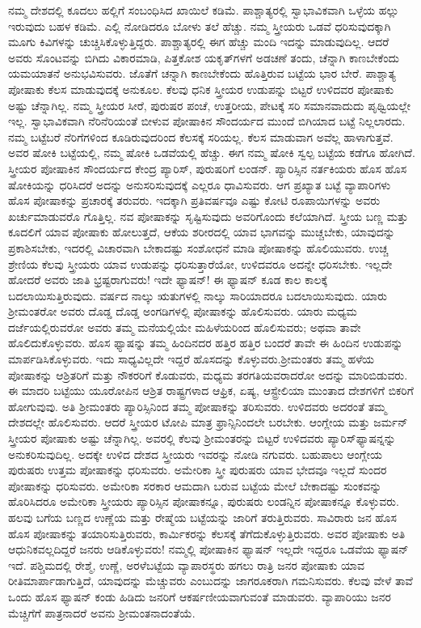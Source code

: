 ನಮ್ಮ ದೇಶದಲ್ಲಿ ಕೂದಲು ಹಲ್ಲಿಗೆ ಸಂಬಂಧಿಸಿದ ಖಾಯಿಲೆ ಕಡಿಮೆ. ಪಾಶ್ಚಾತ್ಯರಲ್ಲಿ ಸ್ವಾಭಾವಿಕವಾಗಿ ಒಳ್ಳೆಯ ಹಲ್ಲು ಇರುವುದು ಬಹಳ ಕಡಿಮೆ. ಎಲ್ಲಿ ನೋಡಿದರೂ ಬೋಳು ತಲೆ ಹೆಚ್ಚು. ನಮ್ಮ ಸ್ತ್ರೀಯರು ಒಡವೆ ಧರಿಸುವುದಕ್ಕಾಗಿ ಮೂಗು ಕಿವಿಗಳನ್ನು ಚುಚ್ಚಿಸಿಕೊಳ್ಳುತ್ತಿದ್ದರು. ಪಾಶ್ಚಾತ್ಯರಲ್ಲಿ ಈಗ ಹೆಚ್ಚು ಮಂದಿ ಇದನ್ನು ಮಾಡುವುದಿಲ್ಲ. ಆದರೆ ಅವರು ಸೊಂಟವನ್ನು ಬಿಗಿದು ವಿಕಾರಮಾಡಿ, ಪಿತ್ತಕೋಶ ಯಕೃತ್​ಗಳಗೆ ಅಡಚಣೆ ತಂದು, ಚೆನ್ನಾಗಿ ಕಾಣಬೇಕೆಂದು ಯಮಯಾತನೆ ಅನುಭವಿಸುವರು. ಜೊತೆಗೆ ಚನ್ನಾಗಿ ಕಾಣಬೇಕೆಂದು ಹೊತ್ತಿರುವ ಬಟ್ಟೆಯ ಭಾರ ಬೇರೆ. ಪಾಶ್ಚಾತ್ಯ ಪೋಷಾಕು ಕೆಲಸ ಮಾಡುವುದಕ್ಕೆ ಅನುಕೂಲ. ಕೆಲವು ಧನಿಕ ಸ್ತ್ರೀಯರ ಉಡುಪನ್ನು ಬಿಟ್ಟರೆ ಉಳಿದವರ ಪೋಷಾಕು ಅಷ್ಟು ಚೆನ್ನಾಗಿಲ್ಲ. ನಮ್ಮ ಸ್ತ್ರೀಯರ ಸೀರೆ, ಪುರುಷರ ಪಂಚೆ, ಉತ್ತರೀಯ, ಪೇಟಕ್ಕೆ ಸರಿ ಸಮಾನವಾದುದು ಪೃಥ್ವಿಯಲ್ಲೇ ಇಲ್ಲ. ಸ್ವಾಭಾವಿಕವಾಗಿ ನೆರಿನೆರಿಯಂತೆ ಬೀಳುವ ಪೋಷಾಕಿನ ಸೌಂದರ್ಯದ ಮುಂದೆ ಬಿಗಿಯಾದ ಬಟ್ಟೆ ನಿಲ್ಲಲಾರದು. ನಮ್ಮ ಬಟ್ಟೆಬರೆ ನೆರಿಗೆಗಳಿಂದ ಕೂಡಿರುವುದರಿಂದ ಕೆಲಸಕ್ಕೆ ಸರಿಯಲ್ಲ. ಕೆಲಸ ಮಾಡುವಾಗ ಅವೆಲ್ಲ ಹಾಳಾಗುತ್ತವೆ. ಅವರ ಷೋಕಿ ಬಟ್ಟೆಯಲ್ಲಿ, ನಮ್ಮ ಷೋಕಿ ಒಡವೆಯಲ್ಲಿ ಹೆಚ್ಚು. ಈಗ ನಮ್ಮ ಷೋಕಿ ಸ್ವಲ್ಪ ಬಟ್ಟೆಯ ಕಡೆಗೂ ಹೋಗಿದೆ. ಸ್ತ್ರೀಯರ ಪೋಷಾಕಿನ ಸೌಂದರ್ಯದ ಕೇಂದ್ರ ಪ್ಯಾರಿಸ್​, ಪುರುಷರಿಗೆ ಲಂಡನ್​. ಪ್ಯಾರಿಸ್ಸಿನ ನರ್ತಕಿಯರು ಹೊಸ ಹೊಸ ಷೋಕಿಯನ್ನು ಧರಿಸಿದರೆ ಅದನ್ನು ಅನುಸರಿಸುವುದಕ್ಕೆ ಎಲ್ಲರೂ ಧಾವಿಸುವರು. ಆಗ ಪ್ರಖ್ಯಾತ ಬಟ್ಟೆ ವ್ಯಾಪಾರಿಗಳು ಹೊಸ ಪೋಷಾಕನ್ನು ಪ್ರಚಾರಕ್ಕೆ ತರುವರು. ಇದಕ್ಕಾಗಿ ಪ್ರತಿವರ್ಷವೂ ಎಷ್ಟು ಕೋಟಿ ರೂಪಾಯಿಗಳನ್ನು ಅವರು ಖರ್ಚುಮಾಡುವರೊ ಗೊತ್ತಿಲ್ಲ. ನವ ಪೋಷಾಕನ್ನು ಸೃಷ್ಟಿಸುವುದು ಅವರಿಗೊಂದು ಕಲೆಯಾಗಿದೆ. ಸ್ತ್ರೀಯ ಬಣ್ಣ ಮತ್ತು ಕೂದಲಿಗೆ ಯಾವ ಪೋಷಾಕು ಹೋಲುತ್ತದೆ, ಆಕೆಯ ಶರೀರದಲ್ಲಿ ಯಾವ ಭಾಗವನ್ನು ಮುಚ್ಚಬೇಕು, ಯಾವುದನ್ನು ಪ್ರಕಾಶಿಸಬೇಕು, ಇದರಲ್ಲಿ ವಿಚಾರವಾಗಿ ಬೇಕಾದಷ್ಟು ಸಂಶೋಧನೆ ಮಾಡಿ ಪೋಷಾಕನ್ನು ಹೊಲಿಯುವರು. ಉಚ್ಚ ಶ್ರೇಣಿಯ ಕೆಲವು ಸ್ತ್ರೀಯರು ಯಾವ ಉಡುಪನ್ನು ಧರಿಸುತ್ತಾರೆಯೋ, ಉಳಿದವರೂ ಅದನ್ನೇ ಧರಿಸಬೇಕು. ಇಲ್ಲದೇ ಹೋದರೆ ಅವರು ಜಾತಿ ಭ್ರಷ್ಟರಾಗುವರು! ಇದೇ ಫ್ಯಾಷನ್​! ಈ ಫ್ಯಾಷನ್​ ಕೂಡ ಕಾಲ ಕಾಲಕ್ಕೆ ಬದಲಾಯಿಸುತ್ತಿರುವುದು. ವರ್ಷದ ನಾಲ್ಕು ಋತುಗಳಲ್ಲಿ ನಾಲ್ಕು ಸಾರಿಯಾದರೂ ಬದಲಾಯಿಸುವುದು. ಯಾರು ಶ‍್ರೀಮಂತರೋ ಅವರು ದೊಡ್ಡ ದೊಡ್ಡ ಅಂಗಡಿಗಳಲ್ಲಿ ಪೋಷಾಕನ್ನು ಹೊಲಿಸುವರು. ಯಾರು ಮಧ್ಯಮ ದರ್ಜೆಯಲ್ಲಿರುವರೋ ಅವರು ತಮ್ಮ ಮನೆಯಲ್ಲಿಯೇ ಮಹಿಳೆಯರಿಂದ ಹೊಲಿಸುವರು; ಅಥವಾ ತಾವೇ ಹೊಲಿದುಕೊಳ್ಳುವರು. ಹೊಸ ಫ್ಯಾಷನ್ನು ತಮ್ಮ ಹಿಂದಿನದರ ಹತ್ತಿರ ಹತ್ತಿರ ಬಂದರೆ ತಾವೇ ಈ ಹಿಂದಿನ ಉಡುಪನ್ನು ಮಾರ್ಪಡಿಸಿಕೊಳ್ಳುವರು. ಇದು ಸಾಧ್ಯವಿಲ್ಲದೇ ಇದ್ದರೆ ಹೊಸದನ್ನು ಕೊಳ್ಳುವರು.\break ಶ‍್ರೀಮಂತರು ತಮ್ಮ ಹಳೆಯ ಪೋಷಾಕನ್ನು ಆಶ್ರಿತರಿಗೆ ಮತ್ತು ನೌಕರರಿಗೆ ಕೊಡುವರು, ಮಧ್ಯಮ ತರಗತಿಯವರಾದರೋ ಅದನ್ನು ಮಾರಿಬಿಡುವರು. ಈ ಮಾದರಿ ಬಟ್ಟೆಯು ಯೂರೋಪಿನ ಆಶ್ರಿತ ರಾಷ್ಟ್ರಗಳಾದ ಆಫ್ರಿಕ, ಏಷ್ಯ, ಆಸ್ಟ್ರೇಲಿಯಾ ಮುಂತಾದ ದೇಶಗಳಿಗೆ ಬಿಕರಿಗೆ ಹೋಗುವುವು. ಅತಿ ಶ‍್ರೀಮಂತರು ಪ್ಯಾರಿಸ್ಸಿನಿಂದ ತಮ್ಮ ಪೋಷಾಕನ್ನು ತರಿಸುವರು. ಉಳಿದವರು ಅದರಂತೆ ತಮ್ಮ ದೇಶದಲ್ಲೇ ಹೊಲಿಸುವರು. ಆದರೆ ಸ್ತ್ರೀಯರ ಟೋಪಿ ಮಾತ್ರ ಫ್ರಾನ್ಸಿನಿಂದಲೇ ಬರಬೇಕು. ಆಂಗ್ಲೇಯ ಮತ್ತು ಜರ್ಮನ್​ ಸ್ತ್ರೀಯರ ಪೋಷಾಕು ಅಷ್ಟು ಚೆನ್ನಾಗಿಲ್ಲ. ಅವರಲ್ಲಿ ಕೆಲವು ಶ‍್ರೀಮಂತರನ್ನು ಬಿಟ್ಟರೆ ಉಳಿದವರು ಪ್ಯಾರಿಸ್​ ಫ್ಯಾಷನ್ನನ್ನು ಅನುಕರಿಸುವುದಿಲ್ಲ. ಅದಕ್ಕೇ ಉಳಿದ ದೇಶದ ಸ್ತ್ರೀಯರು ಇವರನ್ನು ನೋಡಿ ನಗುವರು. ಬಹುಪಾಲು ಆಂಗ್ಲೇಯ ಪುರುಷರು ಉತ್ತಮ ಪೋಷಾಕನ್ನು ಧರಿಸುವರು. ಅಮೇರಿಕಾ ಸ್ತ್ರೀ ಪುರುಷರು ಯಾವ ಭೇದವೂ ಇಲ್ಲದೆ ಸುಂದರ ಪೋಷಾಕನ್ನು ಧರಿಸುವರು. ಅಮೇರಿಕಾ ಸರಕಾರ ಆಮದಾಗಿ ಬರುವ ಬಟ್ಟೆಯ ಮೇಲೆ ಬೇಕಾದಷ್ಟು ಸುಂಕವನ್ನು ಹೊರಿಸಿದರೂ ಅಮೇರಿಕಾ ಸ್ತ್ರೀಯರು ಪ್ಯಾರಿಸ್ಸಿನ ಪೋಷಾಕನ್ನೂ, ಪುರುಷರು ಲಂಡನ್ನಿನ ಪೋಷಾಕನ್ನೂ ಕೊಳ್ಳುವರು. ಹಲವು ಬಗೆಯ ಬಣ್ಣದ ಉಣ್ಣೆಯ ಮತ್ತು ರೇಷ್ಮೆಯ ಬಟ್ಟೆಯನ್ನು ಜಾರಿಗೆ ತರುತ್ತಿರುವರು. ಸಾವಿರಾರು ಜನ ಹೊಸ ಹೊಸ ಪೋಷಾಕನ್ನು ತಯಾರಿಸುತ್ತಿರುವರು, ಕಾರ್ಮಿಕರನ್ನು ಕೆಲಸಕ್ಕೆ ತೆಗೆದುಕೊಳ್ಳುತ್ತಿರುವರು. ಅವರ ಪೋಷಾಕು ಅತಿ ಆಧುನಿಕವಲ್ಲದಿದ್ದರೆ ಜನರು ಆಡಿಕೊಳ್ಳುವರು! ನಮ್ಮಲ್ಲಿ ಪೋಷಾಕಿನ ಫ್ಯಾಷನ್​ ಇಲ್ಲದೇ ಇದ್ದರೂ ಒಡವೆಯ ಫ್ಯಾಷನ್​ ಇದೆ. ಪಶ್ಚಿಮದಲ್ಲಿ ರೇಶ್ಮೆ, ಉಣ್ಣೆ, ಅರಳೆಬಟ್ಟೆಯ ವ್ಯಾಪಾರಸ್ಥರು ಹಗಲು ರಾತ್ರಿ ಜನರ ಪೋಷಾಕು ಯಾವ ರೀತಿ\break ಮಾರ್ಪಾಡಾಗುತ್ತಿದೆ, ಯಾವುದನ್ನು ಮೆಚ್ಚುವರು ಎಂಬುದನ್ನು ಜಾಗರೂಕರಾಗಿ ಗಮನಿಸು\break ವರು. ಕೆಲವು ವೇಳೆ ತಾವೆ ಒಂದು ಹೊಸ ಫ್ಯಾಷನ್​ ಕಂಡು ಹಿಡಿದು ಜನರಿಗೆ ಆಕರ್ಷಣೀಯ\break ವಾಗುವಂತೆ ಮಾಡುವರು. ವ್ಯಾಪಾರಿಯು ಜನರ ಮೆಚ್ಚಿಗೆಗೆ ಪಾತ್ರನಾದರೆ ಅವನು ಶ‍್ರೀಮಂತನಾದಂತೆಯೆ. 